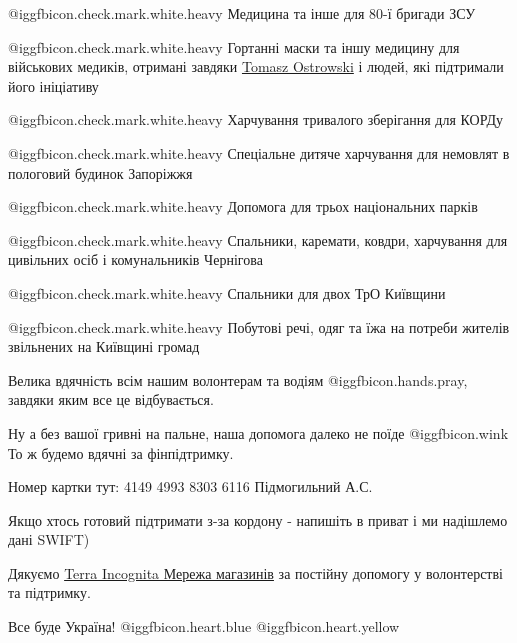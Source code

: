 @igg{fbicon.check.mark.white.heavy}  Медицина та інше для 80-ї бригади ЗСУ

@igg{fbicon.check.mark.white.heavy}  Гортанні маски та іншу медицину для
військових медиків, отримані завдяки
\href{https://www.facebook.com/tomasz.ostrowski.714}{Tomasz Ostrowski}  і
людей, які підтримали його ініціативу 

@igg{fbicon.check.mark.white.heavy}  Харчування тривалого зберігання для КОРДу

@igg{fbicon.check.mark.white.heavy}  Спеціальне дитяче харчування для немовлят
в пологовий будинок Запоріжжя


@igg{fbicon.check.mark.white.heavy}  Допомога для трьох національних парків

@igg{fbicon.check.mark.white.heavy}  Спальники, каремати, ковдри, харчування
для цивільних осіб і комунальників Чернігова

@igg{fbicon.check.mark.white.heavy}  Спальники для двох ТрО Київщини 

@igg{fbicon.check.mark.white.heavy}  Побутові речі, одяг та їжа на потреби
жителів звільнених на Київщині громад

Велика вдячність всім нашим волонтерам та водіям @igg{fbicon.hands.pray}, завдяки яким все це
відбувається.


Ну а без вашої гривні на пальне, наша допомога далеко не поїде @igg{fbicon.wink}  То ж будемо
вдячні за фінпідтримку. 

Номер картки тут: 4149 4993 8303 6116 Підмогильний А.С. 

Якщо хтось готовий підтримати з-за кордону - напишіть в приват і ми надішлемо
дані SWIFT) 

Дякуємо \href{https://www.facebook.com/TerraIncognitaUA}{Terra Incognita Мережа магазинів} за постійну допомогу у волонтерстві та
підтримку.

Все буде Україна! @igg{fbicon.heart.blue}  @igg{fbicon.heart.yellow} 

